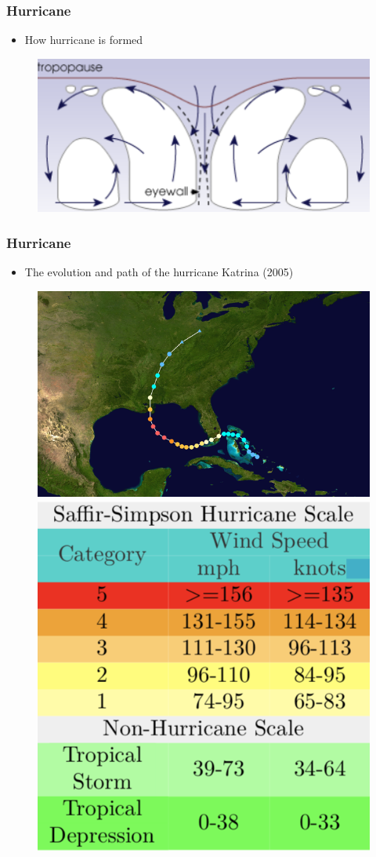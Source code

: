 \documentclass{beamer}
\begin{document}
\begin{frame}
\frametitle{Hurricane}
\begin{itemize}
	\item How hurricane is formed \\
\end{itemize}
\begin{figure}
\includegraphics[width=0.8\linewidth]{figs/hurricane_section.png}
\end{figure}
\end{frame}

\begin{frame}
\frametitle{Hurricane}
\begin{itemize}
	\item The evolution and path of the hurricane Katrina (2005) \\
\end{itemize}
\begin{figure}
	\includegraphics[width=0.6\linewidth, height=0.6\textheight]{figs/Katrina.png}
	\includegraphics[width=0.3\linewidth, height=0.4\textheight]{figs/saffir-simpson.png}
\end{figure}
\end{frame}
\end{document}
